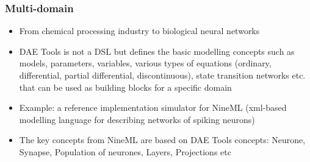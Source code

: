 \documentclass{beamer}
\begin{document}
\begin{frame}
\frametitle{Multi-domain}
\begin{block}{}
\begin{itemize}
  \item From chemical processing industry to biological neural networks
  \item DAE Tools is not a DSL but defines the basic modelling concepts such as models, parameters, variables, various types of equations 
        (ordinary, differential, partial differential, discontinuous), state transition networks etc. that can be used as building blocks 
        for a specific domain
  \item Example: a reference implementation simulator for NineML (xml-based modelling language for describing networks of spiking neurons)
  \item The key concepts from NineML are based on DAE Tools concepts: Neurone, Synapse, Population of neurones, Layers, Projections etc
\end{itemize}
\end{block}
\end{frame}
\end{document}
